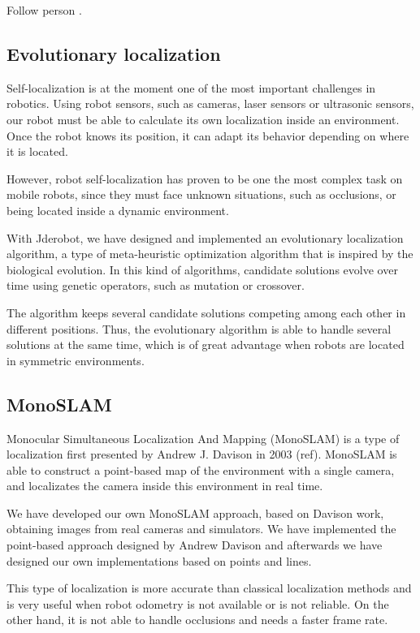 \documentclass[twocolumn]{svjour3}          %
\begin{document}
Follow person \cite{canas05d}.

\subsection{Evolutionary localization}

Self-localization is at the moment one of the most important challenges in robotics. Using robot sensors, such as cameras, laser sensors or ultrasonic sensors, our robot must be able to calculate its own localization inside an environment. Once the robot knows its position, it can adapt its behavior depending on where it is located. 
 
However, robot self-localization has proven to be one the most complex task on mobile robots, since they must face unknown situations, such as occlusions, or being located inside a dynamic environment.

With Jderobot, we have designed and implemented an evolutionary localization algorithm, a type of meta-heuristic optimization algorithm that is inspired by the biological evolution. In this kind of algorithms, candidate solutions evolve over time using genetic operators, such as mutation or crossover. 

The algorithm keeps several candidate solutions competing among each other in different positions. Thus, the evolutionary algorithm is able to handle several solutions at the same time, which is of great advantage when robots are located in symmetric environments.  

\subsection{MonoSLAM}

Monocular Simultaneous Localization And Mapping (MonoSLAM) is a type of localization first presented by Andrew J. Davison in 2003 (ref). MonoSLAM is able to construct a point-based map of the environment with a single camera, and localizates the camera inside this environment in real time.

We have developed our own MonoSLAM approach, based on Davison work, obtaining images from real cameras and simulators. We have implemented the point-based approach designed by Andrew Davison and afterwards we have designed our own implementations based on points and lines.

This type of localization is more accurate than classical localization methods and is very useful when robot odometry is not available or is not reliable. On the other hand, it is not able to handle occlusions and needs a faster frame rate.
\end{document}
